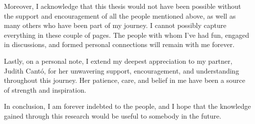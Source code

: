 \begin{Acknowledgements}
	Moreover, I acknowledge that this thesis would not have been possible without the support and encouragement of all the people mentioned above, as well as many others who have been part of my journey. I cannot possibly capture everything in these couple of pages. The people with whom I've had fun, engaged in discussions, and formed personal connections will remain with me forever.
	
	Lastly, on a personal note, I extend my deepest appreciation to my partner, Judith Cantó, for her unwavering support, encouragement, and understanding throughout this journey. Her patience, care, and belief in me have been a source of strength and inspiration.
	
	In conclusion, I am forever indebted to the people, and I hope that the knowledge gained through this research would be useful to somebody in the future.
	
	
	
	
	
	
	
	
	
	
	
	
	
	
	
	
	
	
	
	
\end{Acknowledgements}
\cleardoublepage